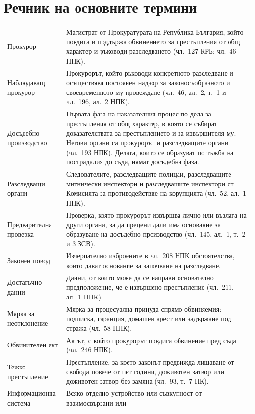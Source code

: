 \section*{Речник на основните термини}
\label{sec:rechnik}

{\small
\begin{longtable}{@{}T{4.1cm}L{12.7cm}@{}}
Прокурор & Магистрат от Прокуратурата на Република България, който повдига и поддържа
обвинението за престъпления от общ характер и ръководи разследването (чл.~127 КРБ;
чл.~46 НПК).\\
Наблюдаващ прокурор & Прокурорът, който ръководи конкретното разследване и осъществява
постоянен надзор за законосъобразното и своевременното му провеждане (чл.~46, ал.~2, т.~1
и чл.~196, ал.~2 НПК).\\
Досъдебно производство & Първата фаза на наказателния процес по дела за престъпления от
общ характер, в която се събират доказателствата за престъплението и за извършителя му.
Негови органи са прокурорът и разследващите органи (чл.~193 НПК). Делата, които се
образуват по тъжба на пострадалия до съда, нямат досъдебна фаза.\\
Разследващи органи & Следователите, разследващите полицаи, разследващите митнически
инспектори и разследващите инспектори от Комисията за противодействие на корупцията
(чл.~52, ал.~1 НПК).\\
Предварителна проверка & Проверка, която прокурорът извършва лично или възлага на други
органи, за да прецени дали има основание за образуване на досъдебно производство
(чл.~145, ал.~1, т.~2 и 3 ЗСВ).\\
Законен повод & Изчерпателно изброените в чл.~208 НПК обстоятелства, които дават
основание за започване на разследване.\\
Достатъчно данни & Данни, от които може да се направи основателно предположение, че е
извършено престъпление (чл.~211, ал.~1 НПК).\\
Мярка за неотклонение & Мярка за процесуална принуда спрямо обвиняемия: подписка,
гаранция, домашен арест или задържане под стража (чл.~58 НПК).\\
Обвинителен акт & Актът, с който прокурорът повдига обвинение пред съда (чл.~246 НПК).\\
Тежко престъпление & Престъпление, за което законът предвижда лишаване от свобода повече
от пет години, доживотен затвор или доживотен затвор без замяна (чл.~93, т.~7 НК).\\
Информационна система & Всяко отделно устройство или съвкупност от взаимосвързани или

\end{longtable}}
